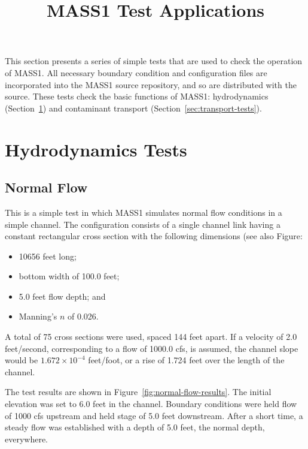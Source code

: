 \documentclass[12pt,dvips,letterpaper]{article}
\title{MASS1 Test Applications}
\begin{document}
\maketitle{}
\tableofcontents{}


This section presents a series of simple tests that are used to check
the operation of MASS1. All necessary boundary condition and
configuration files are incorporated into the MASS1 source
repository, and so are distributed with the source.  These tests
check the basic functions of  MASS1: hydrodynamics
(Section~\ref{sec:hydro-tests}) and contaminant transport
(Section~\ref{sec:transport-tests}).  

\section{Hydrodynamics Tests}
\label{sec:hydro-tests}


\subsection{Normal Flow}
\label{sec:normal-flow}

This is a simple test in which MASS1 simulates normal flow conditions
in a simple channel.  The configuration consists of a single channel
link having a constant rectangular cross section with the following
dimensions (see also Figure:
\begin{itemize}
\item 10656 feet long;
\item bottom width of 100.0 feet;
\item 5.0 feet flow depth; and
\item Manning's $n$ of 0.026.
\end{itemize}
A total of 75 cross sections were used, spaced 144 feet apart. If a
velocity of 2.0 feet/second, corresponding to a flow of 1000.0 cfs, is
assumed, the channel slope would be $1.672 \times 10^{-4}$ feet/foot,
or a rise of 1.724 feet over the length of the channel.  

The test results are shown in Figure~\ref{fig:normal-flow-results}.
The initial elevation was set to 6.0 feet in the channel.  Boundary
conditions were held flow of 1000 cfs upstream and held stage of 5.0
feet downstream. After a short time, a steady flow was established
with a depth of 5.0 feet, the normal depth, everywhere.  
\end{document}
